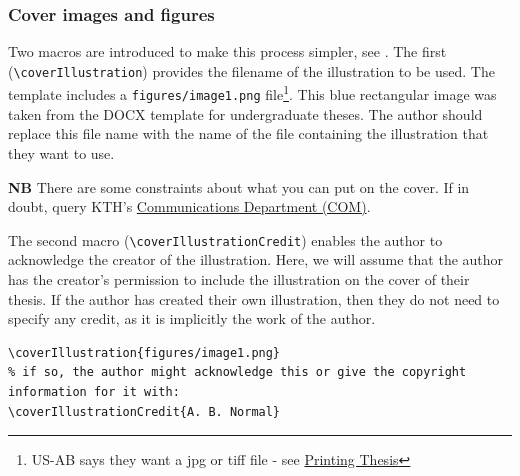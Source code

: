 \documentclass[12pt, twoside]{article}
\begin{document}
    
\subsubsection{Cover images and figures}
Two macros are introduced to make this process simpler, see . The first (\texttt{\textbackslash coverIllustration}) provides the filename of the illustration to be used. The template includes a \texttt{figures/image1.png} file\footnote{US-AB says they want a jpg or tiff file - see \href{https://www.kth.se/en/student/studier/examensarbete/avhandlingarochexamensarbeten/trycka-avhandlingar-1.900190}{Printing Thesis}}. This blue rectangular image was taken from the \gls{DOCX} template for undergraduate theses. The author should replace this file name with the name of the file containing the illustration that they want to use.

\textbf{NB} There are some constraints about what you can put on the cover. If in doubt, query KTH's \href{https://intra.kth.se/en/styrning/kths-organisation/verksamhetsstod/kommunikationsavdelningen-1.872391}{Communications Department (COM)}.

The second macro (\texttt{\textbackslash coverIllustrationCredit}) enables the author to acknowledge the creator of the illustration. Here, we will assume that the author has the creator's permission to include the illustration on the cover of their thesis. If the author has created their own illustration, then they do not need to specify any credit, as it is implicitly the work of the author.

\begin{lstlisting}[style=latexExampleForAuthors, caption={Configuring a cover illustration}, label=lst:SettingCoverIllustration]
% It is possible to have a cover illustration
\coverIllustration{figures/image1.png}
% if so, the author might acknowledge this or give the copyright information for it with:
\coverIllustrationCredit{A. B. Normal}
\end{lstlisting}
\end{document}
